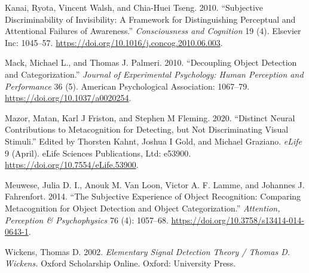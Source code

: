\documentclass[]{article}
\begin{document}
\leavevmode\hypertarget{ref-kanai2010cc}{}%
Kanai, Ryota, Vincent Walsh, and Chia-Huei Tseng. 2010. ``Subjective
Discriminability of Invisibility: A Framework for Distinguishing
Perceptual and Attentional Failures of Awareness.'' \emph{Consciousness
and Cognition} 19 (4). Elsevier Inc: 1045--57.
\url{https://doi.org/10.1016/j.concog.2010.06.003}.

\leavevmode\hypertarget{ref-mack2010jephpp}{}%
Mack, Michael L., and Thomas J. Palmeri. 2010. ``Decoupling Object
Detection and Categorization.'' \emph{Journal of Experimental
Psychology: Human Perception and Performance} 36 (5). American
Psychological Association: 1067--79.
\url{https://doi.org/10.1037/a0020254}.

\leavevmode\hypertarget{ref-mazor2020e}{}%
Mazor, Matan, Karl J Friston, and Stephen M Fleming. 2020. ``Distinct
Neural Contributions to Metacognition for Detecting, but Not
Discriminating Visual Stimuli.'' Edited by Thorsten Kahnt, Joshua I
Gold, and Michael Graziano. \emph{eLife} 9 (April). eLife Sciences
Publications, Ltd: e53900. \url{https://doi.org/10.7554/eLife.53900}.

\leavevmode\hypertarget{ref-meuwese2014app}{}%
Meuwese, Julia D. I., Anouk M. Van Loon, Victor A. F. Lamme, and
Johannes J. Fahrenfort. 2014. ``The Subjective Experience of Object
Recognition: Comparing Metacognition for Object Detection and Object
Categorization.'' \emph{Attention, Perception \& Psychophysics} 76 (4):
1057--68. \url{https://doi.org/10.3758/s13414-014-0643-1}.

\leavevmode\hypertarget{ref-wickens2002}{}%
Wickens, Thomas D. 2002. \emph{Elementary Signal Detection Theory /
Thomas D. Wickens.} Oxford Scholarship Online. Oxford: University Press.
\end{document}
